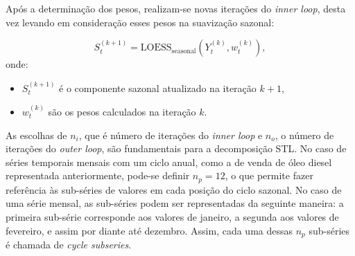 Após a determinação dos pesos, realizam-se novas iterações do \textit{inner loop}, desta vez levando em consideração esses pesos na suavização sazonal:

\begin{equation}
    S^{(k+1)}_t = \text{LOESS}_{\text{seasonal}}(Y^{(k)}_t, w_t^{(k)}),
    \label{eq:seasonal_smoothing_weights}
\end{equation}
onde:
\begin{itemize}
    \item \( S^{(k+1)}_t \) é o componente sazonal atualizado na iteração \( k+1 \),
    \item \( w_t^{(k)} \) são os pesos calculados na iteração \( k \).
\end{itemize}


As escolhas de \( n_i \), que é número de iterações do \textit{inner loop} e \( n_o \), o número de iterações do \textit{outer loop}, são fundamentais para a decomposição STL. No caso de séries temporais mensais com um ciclo anual, como a de venda de óleo diesel representada anteriormente, pode-se definir \( n_p = 12 \), o que permite fazer referência às sub-séries de valores em cada posição do ciclo sazonal. No caso de uma série mensal, as sub-séries podem ser representadas da seguinte maneira: a primeira sub-série corresponde aos valores de janeiro, a segunda aos valores de fevereiro, e assim por diante até dezembro. Assim, cada uma dessas \( n_p \) sub-séries é chamada de \textit{cycle subseries}.





